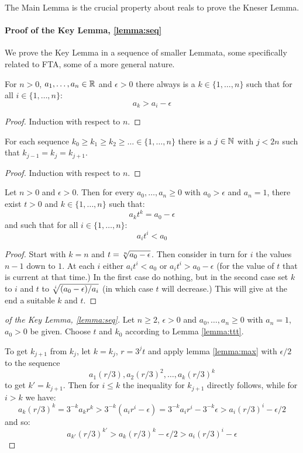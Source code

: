 The Main Lemma is the crucial property about reals to prove the Kneser Lemma.

\paragraph{Proof of the Key Lemma, \ref{lemma:seq}}
We prove the Key Lemma in a sequence of smaller Lemmata, some
specifically related to FTA, some of a more general nature.

\begin{lemma}\label{lemma:max}
For $n>0$, $a_1,\ldots,a_n\in\mathbb{R}$ and $\epsilon > 0$ there always is a
$k\in \{1, \ldots ,n\}$ such that for all $i\in\{1,\ldots,n\}$:
$$a_k > a_i - \epsilon$$
\end{lemma}
\begin{proof}
Induction with respect to $n$.
\end{proof}

\begin{lemma}\label{lemma:sel}
For each sequence $k_0 \ge k_1 \ge k_2 \ge \ldots\in\{1,\ldots,n\}$ there is
a $j\in\mathbb{N}$ with $j < 2n$ such that $k_{j-1} = k_j = k_{j+1}$.
\end{lemma}
\begin{proof}
Induction with respect to $n$.
\end{proof}

\begin{lemma}\label{lemma:ttt}
Let $n>0$ and $\epsilon > 0$.
Then for every $a_0,\ldots,a_n \ge 0$ with $a_0 > \epsilon$ and $a_n = 1$, there exist
$t > 0$ and $k\in\{1,\ldots,n\}$ such that:
$$a_k t^k = a_0 - \epsilon$$
and such that for all $i\in\{1,\ldots,n\}$:
$$a_i t^i < a_0$$
\end{lemma}
\begin{proof}
Start with $k = n$ and $t = \root n\of{a_0 - \epsilon}$.  Then consider in turn
for $i$ the values $n-1$ down to $1$.
At each $i$ either $a_i t^i < a_0$
or $a_i t^i > a_0 - \epsilon$ (for the value of $t$ that is current at that time.)
In the first case do nothing, but in the second case
set $k$ to $i$ and $t$ to $\root i\of{(a_0 - \epsilon)/a_i}$
(in which case $t$ will decrease.)  This will give at the end a suitable $k$ and $t$.
\end{proof}

\begin{proof}[of the Key Lemma, \ref{lemma:seq}]
Let $n\geq 2$, $\epsilon>0$ and $a_0, \ldots , a_n \geq 0$ with $a_n =
1$, $a_0>0$ be given.
Choose $t$ and $k_0$ according to Lemma \ref{lemma:ttt}.

To get $k_{j+1}$ from $k_j$, let $k = k_j$, $r = 3^j t$
and apply lemma \ref{lemma:max} with $\epsilon/2$ to the sequence
$$a_1 (r/3),a_2 (r/3)^2,\ldots,a_k (r/3)^k$$
to get $k' = k_{j+1}$.
Then for $i\le k$ the inequality for $k_{j+1}$ directly follows,
while for $i > k$ we have:
$$a_k (r/3)^k = 3^{-k} a_k r^k > 3^{-k}\left(a_i r^i - \epsilon\right) = 3^{-k} a_i r^i - 3^{-k}\epsilon
> a_i (r/3)^i - \epsilon/2$$
and so:
$$a_{k'} (r/3)^{k'} > a_k (r/3)^k - \epsilon/2 > a_i (r/3)^i - \epsilon$$
\end{proof} 

